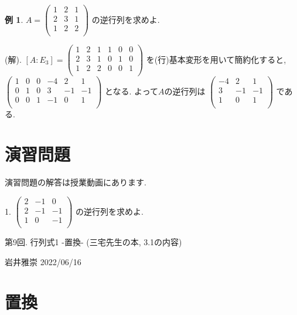 \documentclass[dvipdfmx,a4paper,11pt]{article}
\theoremstyle{definition}
\newtheorem{exa}[thm]{例}
\begin{document}
 \begin{exa}
 $
  A=\begin{pmatrix}
 1& 2&1 \\
 2& 3 & 1 \\
 1& 2 &  2 \\
 \end{pmatrix} 
 $
 の逆行列を求めよ.
 
 (解).
 $[A:E_3] = 
 \begin{pmatrix}
 1& 2&1  &1& 0&0 \\
 2& 3 & 1 &0& 1&0 \\
 1& 2 &  2 &0& 0&1 \\
 \end{pmatrix} 
 $
 を(行)基本変形を用いて簡約化すると, \\
 $
 \begin{pmatrix}
 1& 0&0  &-4& 2&1 \\
 0& 1 & 0 &3& -1&-1 \\
 0& 0&  1 &-1& 0&1 \\
 \end{pmatrix} 
 $
 となる. よって$A$の逆行列は
 $
 \begin{pmatrix}
-4& 2&1 \\
3& -1&-1\\
1& 0&1 \\
 \end{pmatrix} 
 $
 である.
 \end{exa}

\section{演習問題}
演習問題の解答は授業動画にあります.

1.
$
\begin{pmatrix}
 2& -1& 0\\
 2& -1 & -1 \\
 1& 0 &  -1 \\
 \end{pmatrix} 
 $
 の逆行列を求めよ.

 

\newpage

\begin{center}
{\Large 第9回. 行列式1 -置換- (三宅先生の本, 3.1の内容)}
\end{center}

\begin{flushright}
 岩井雅崇 2022/06/16
\end{flushright}

\section{置換}
\end{document}
